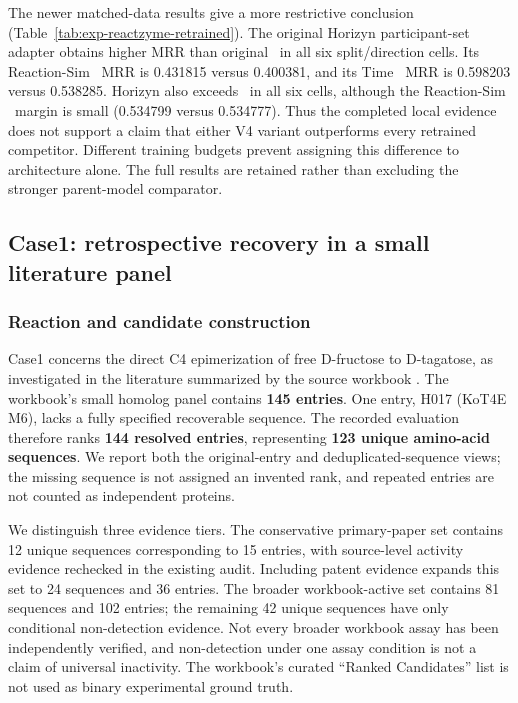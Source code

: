 The newer matched-data results give a more restrictive conclusion
(Table~\ref{tab:exp-reactzyme-retrained}). The original Horizyn
participant-set adapter obtains higher MRR than original \methodname\ in
all six split/direction cells. Its Reaction-Sim \expRtoE\ MRR is 0.431815
versus 0.400381, and its Time \expRtoE\ MRR is 0.598203 versus 0.538285.
Horizyn also exceeds \vfourBio\ in all six cells, although the
Reaction-Sim \expEtoR\ margin is small (0.534799 versus 0.534777). Thus the completed
local evidence does not support a claim that either V4 variant outperforms
every retrained competitor. Different training budgets prevent assigning
this difference to architecture alone. The full results are retained rather
than excluding the stronger parent-model comparator.
\FloatBarrier

\subsection{Case1: retrospective recovery in a small literature panel}
\label{sec:exp-case1}
\subsubsection{Reaction and candidate construction}

Case1 concerns the direct C4 epimerization of free D-fructose to D-tagatose,
as investigated in the literature summarized by the source workbook
\citep{caseS01,caseS02,caseS03,caseS04,caseS05,caseS06,caseS16,caseS17}.
The workbook's small homolog panel contains \textbf{145 entries}. One entry,
H017 (KoT4E M6), lacks a fully specified recoverable sequence. The recorded
evaluation therefore ranks \textbf{144 resolved entries}, representing
\textbf{123 unique amino-acid sequences}. We report both the original-entry
and deduplicated-sequence views; the missing sequence is not assigned an
invented rank, and repeated entries are not counted as independent proteins.

We distinguish three evidence tiers. The conservative primary-paper set
contains 12 unique sequences corresponding to 15 entries, with source-level
activity evidence rechecked in the existing audit. Including patent evidence
expands this set to 24 sequences and 36 entries. The broader workbook-active
set contains 81 sequences and 102 entries; the remaining 42 unique sequences
have only conditional non-detection evidence. Not every broader workbook
assay has been independently verified, and non-detection under one assay
condition is not a claim of universal inactivity. The workbook's curated
``Ranked Candidates'' list is not used as binary experimental ground truth.

